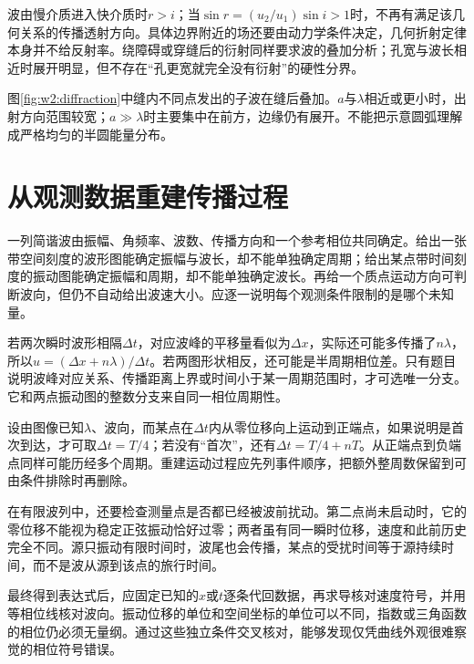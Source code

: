 波由慢介质进入快介质时$r>i$；当$\sin r=(u_2/u_1)\sin i>1$时，不再有满足该几何关系的传播透射方向。具体边界附近的场还要由动力学条件决定，几何折射定律本身并不给反射率。绕障碍或穿缝后的衍射同样要求波的叠加分析；孔宽与波长相近时展开明显，但不存在“孔更宽就完全没有衍射”的硬性分界。

图\ref{fig:w2:diffraction}中缝内不同点发出的子波在缝后叠加。$a$与$\lambda$相近或更小时，出射方向范围较宽；$a\gg\lambda$时主要集中在前方，边缘仍有展开。不能把示意圆弧理解成严格均匀的半圆能量分布。


\section{从观测数据重建传播过程}
一列简谐波由振幅、角频率、波数、传播方向和一个参考相位共同确定。给出一张带空间刻度的波形图能确定振幅与波长，却不能单独确定周期；给出某点带时间刻度的振动图能确定振幅和周期，却不能单独确定波长。再给一个质点运动方向可判断波向，但仍不自动给出波速大小。应逐一说明每个观测条件限制的是哪个未知量。

若两次瞬时波形相隔$\Delta t$，对应波峰的平移量看似为$\Delta x$，实际还可能多传播了$n\lambda$，所以$u=(\Delta x+n\lambda)/\Delta t$。若两图形状相反，还可能是半周期相位差。只有题目说明波峰对应关系、传播距离上界或时间小于某一周期范围时，才可选唯一分支。它和两点振动图的整数分支来自同一相位周期性。

设由图像已知$\lambda$、波向，而某点在$\Delta t$内从零位移向上运动到正端点，如果说明是首次到达，才可取$\Delta t=T/4$；若没有“首次”，还有$\Delta t=T/4+nT$。从正端点到负端点同样可能历经多个周期。重建运动过程应先列事件顺序，把额外整周数保留到可由条件排除时再删除。

在有限波列中，还要检查测量点是否都已经被波前扰动。第二点尚未启动时，它的零位移不能视为稳定正弦振动恰好过零；两者虽有同一瞬时位移，速度和此前历史完全不同。源只振动有限时间时，波尾也会传播，某点的受扰时间等于源持续时间，而不是波从源到该点的旅行时间。

最终得到表达式后，应固定已知的$x$或$t$逐条代回数据，再求导核对速度符号，并用等相位线核对波向。振动位移的单位和空间坐标的单位可以不同，指数或三角函数的相位仍必须无量纲。通过这些独立条件交叉核对，能够发现仅凭曲线外观很难察觉的相位符号错误。

